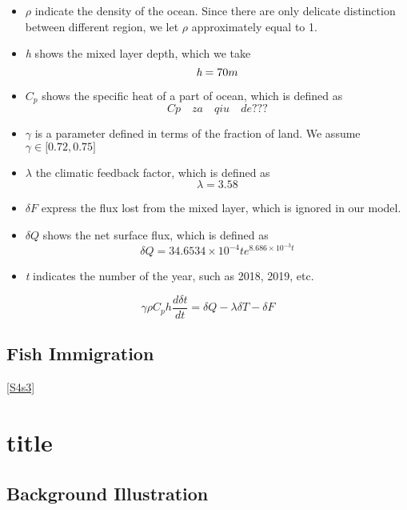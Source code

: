 \documentclass{mcmthesis}
\begin{document}
\begin{itemize}
	\item $\rho$ indicate the density of the ocean. Since there are only delicate distinction between different region, we let $\rho$ approximately equal to 1. 
	\item \emph{h} shows the mixed layer depth, which we take
		\begin{equation*}
		\emph{h}  = 70m
		\end {equation*}
	\item $C_p$ shows the specific heat of a part of ocean, which is defined as 
		\begin{equation*}
		Cp\quad za\quad qiu\quad de ???
		\end {equation*}
	\item $\gamma$ is a parameter defined in terms of the fraction of land. We assume $\gamma \in \big[0.72,0.75\big]$ 
	\item $\lambda$ the climatic feedback factor, which is defined as 
		\begin{equation*}
		\lambda = 3.58
		\end {equation*}
	\item  $\delta F$ express the flux lost from the mixed layer, which is ignored in our model. 
		
	\item $\delta Q$ shows the net surface flux, which is defined as
		\begin{equation*}
		\delta Q = 34.6534 \times 10^{-4}te^{8.686\times 10^{-3}t}
		\end {equation*}
	\item \emph{t} indicates the number of the year, such as 2018, 2019, etc.
\end{itemize}
\begin{equation*}\label{set1}
\gamma\rho C_{p} h\frac{d\delta t}{dt} = \delta Q - \lambda\delta T - \delta F
\end{equation*}
\par

\subsection{Fish Immigration}\ref{S4s3}
	


\section{title}\label{S5}

\subsection{Background Illustration}
   
\end{document}
